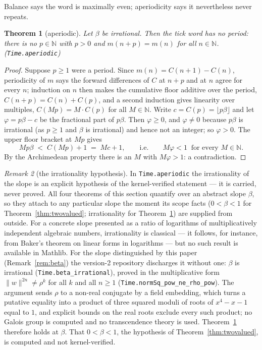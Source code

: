 \documentclass[11pt]{amsart}
\theoremstyle{plain}
\newtheorem{theorem}{Theorem}[section]
\theoremstyle{definition}
\theoremstyle{remark}
\newtheorem{remark}[theorem]{Remark}
\begin{document}
Balance says the word is maximally even; aperiodicity says it nevertheless never repeats.

\begin{theorem}[aperiodic]\label{thm:aperiodic}
Let $\beta$ be irrational. Then the tick word has no period: there is no $p \in \mathbb{N}$ with $p > 0$ and $m(n + p) = m(n)$ for all $n \in \mathbb{N}$. (\texttt{Time.aperiodic})
\end{theorem}

\begin{proof}
Suppose $p \ge 1$ were a period. Since $m(n) = C(n+1) - C(n)$, periodicity of $m$ says the forward differences of $C$ at $n + p$ and at $n$ agree for every $n$; induction on $n$ then makes the cumulative floor additive over the period, $C(n + p) = C(n) + C(p)$, and a second induction gives linearity over multiples, $C(Mp) = M \cdot C(p)$ for all $M \in \mathbb{N}$. Write $c = C(p) = \lfloor p\beta \rfloor$ and let $\varphi = p\beta - c$ be the fractional part of $p\beta$. Then $\varphi \ge 0$, and $\varphi \ne 0$ because $p\beta$ is irrational (as $p \ge 1$ and $\beta$ is irrational) and hence not an integer; so $\varphi > 0$. The upper floor bracket at $Mp$ gives
\[
  Mp\beta \;<\; C(Mp) + 1 \;=\; Mc + 1,
  \qquad\text{i.e.}\qquad
  M \varphi < 1 \ \text{ for every } M \in \mathbb{N}.
\]
By the Archimedean property there is an $M$ with $M\varphi > 1$: a contradiction.
\end{proof}

\begin{remark}[the irrationality hypothesis]\label{rem:irrational-hyp}
In \texttt{Time.aperiodic} the irrationality of the slope is an explicit hypothesis of the kernel-verified statement --- it is carried, never proved. All four theorems of this section quantify over an abstract slope $\beta$, so they attach to any particular slope the moment its scope facts ($0 < \beta < 1$ for Theorem~\ref{thm:twovalued}; irrationality for Theorem~\ref{thm:aperiodic}) are supplied from outside. For a concrete slope presented as a ratio of logarithms of multiplicatively independent algebraic numbers, irrationality is classical --- it follows, for instance, from Baker's theorem on linear forms in logarithms --- but no such result is available in Mathlib. For the slope distinguished by this paper (Remark~\ref{rem:beta}) the version-2 repository discharges it without one: $\beta$ is irrational (\texttt{Time.beta\_irrational}), proved in the multiplicative form $\lVert w \rVert^{2n} \ne \rho^{k}$ for all $k$ and all $n \ge 1$ (\texttt{Time.normSq\_pow\_ne\_rho\_pow}). The argument sends $\rho$ to a non-real conjugate by a field embedding, which turns a putative equality into a product of three squared moduli of roots of $x^4 - x - 1$ equal to $1$, and explicit bounds on the real roots exclude every such product; no Galois group is computed and no transcendence theory is used. Theorem~\ref{thm:aperiodic} therefore holds at $\beta$. That $0 < \beta < 1$, the hypothesis of Theorem~\ref{thm:twovalued}, is computed and not kernel-verified.
\end{remark}
\end{document}
